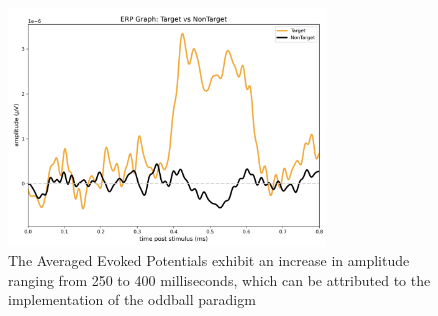 \begin{figure}
    \centering
     \includegraphics[width=0.75\textwidth]{figures/BrainInvaders15a/erp_graph_1.png}  
    
    \caption{The Averaged Evoked Potentials exhibit an increase in amplitude ranging from 250 to 400 milliseconds, which can be attributed to the implementation of the oddball paradigm}
    \label{fig:ERP Graph}

 \end{figure}
  


